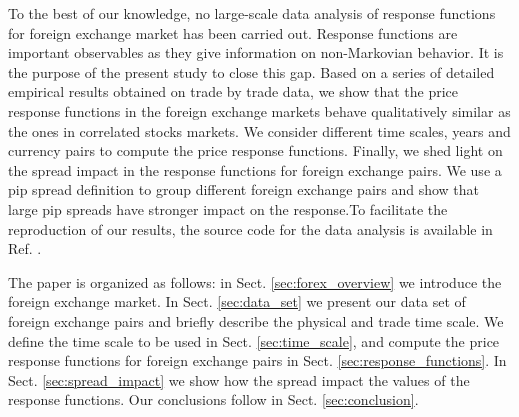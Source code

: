 To the best of our knowledge, no large-scale data analysis of response
functions for foreign exchange market has been carried out. Response functions
are important observables as they give information on non-Markovian behavior.
It is the purpose of the present study to close this gap. Based on a series of
detailed empirical results obtained on trade by trade data, we show that the
price response functions in the foreign exchange markets behave qualitatively
similar as the ones in correlated stocks markets. We consider different time
scales, years and currency pairs to compute the price response functions.
Finally, we shed light on the spread impact in the response functions for
foreign exchange pairs. We use a pip spread definition to group different
foreign exchange pairs and show that large pip spreads have stronger impact
on the response.To facilitate the reproduction of our results, the source code
for the data analysis is available in Ref. \cite{code}.

The paper is organized as follows: in Sect. \ref{sec:forex_overview} we
introduce the foreign exchange market. In Sect. \ref{sec:data_set} we present
our data set of foreign exchange pairs and briefly describe the physical and
trade time scale. We define the time scale to be used in Sect.
\ref{sec:time_scale}, and compute the price response functions for foreign
exchange pairs in Sect.  \ref{sec:response_functions}. In Sect.
\ref{sec:spread_impact} we show how the spread impact the values of the
response functions. Our conclusions follow in Sect. \ref{sec:conclusion}.